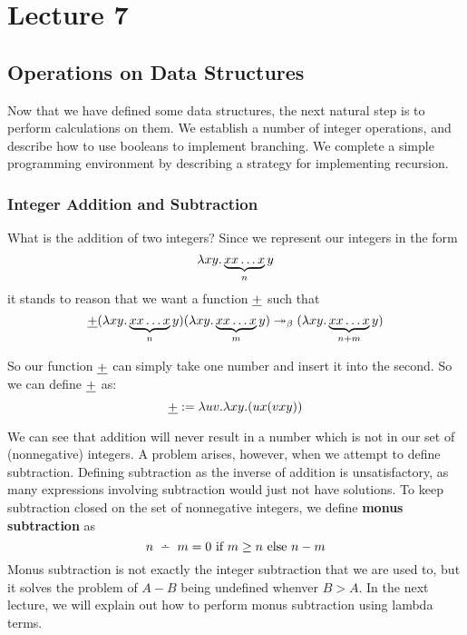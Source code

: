 \chapter{Lecture 7}

\section{Operations on Data Structures}
Now that we have defined some data structures, the next natural step is to perform calculations on them. We establish a number of integer operations, and describe how to use booleans to implement branching. We complete a simple programming environment by describing a strategy for implementing recursion.

\subsection{Integer Addition and Subtraction}
What is the addition of two integers? Since we represent our integers in the form
\begin{equation*}
  \lambda xy.\underbrace{xx\ldots x}_{n}y
\end{equation*}
it stands to reason that we want a function $\uline{+}$ such that
\begin{equation*}
  \uline{+}(\l xy.\underbrace{xx\ldots x}_{n}y)(\l xy.\underbrace{xx\ldots x}_{m}y) \twoheadrightarrow_\beta (\l xy.\underbrace{xx\ldots x}_{n + m}y)
\end{equation*}

So our function $\uline{+}$ can simply take one number and insert it into the second. So we can define $\uline{+}$ as:
\begin{equation*}
  \uline{+} := \l uv.\l xy.(ux(vxy))
\end{equation*}

We can see that addition will never result in a number which is not in our set of (nonnegative) integers. A problem arises, however, when we attempt to define subtraction. Defining subtraction as the inverse of addition is unsatisfactory, as many expressions involving subtraction would just not have solutions. To keep subtraction closed on the set of nonnegative integers, we define \textbf{monus subtraction} as
\begin{equation*}
  n \monus m = 0 \hbox{ if } m \geq n \hbox{ else } n - m
\end{equation*}
Monus subtraction is not exactly the integer subtraction that we are used to, but it solves the problem of $A - B$ being undefined whenver $B > A$. In the next lecture, we will explain out how to perform monus subtraction using lambda terms.

